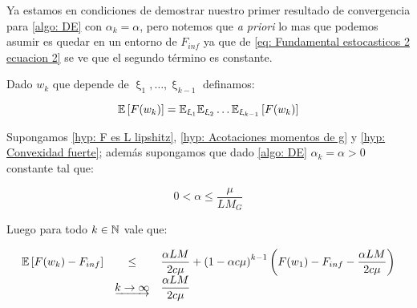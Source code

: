 Ya estamos en condiciones de demostrar nuestro primer resultado de convergencia para \ref{algo: DE} con $\alpha_k = \alpha$, pero notemos que \textit{a priori} lo mas que podemos asumir es quedar en un entorno de $F_{inf}$ ya que de \ref{eq: Fundamental estocasticos 2 ecuacion 2} se ve que el segundo t\'ermino es constante.

Dado $w_k$ que depende de $\upxi_{1}, \dots, \upxi_{k-1}$ definamos:

\begin{equation*}
	\label{def: esperanza total}
	\mathbb{E} \left[F(w_k)\right] = \mathbb{E}_{\upxi_{1}}\mathbb{E}_{\upxi_{2}}\dots \mathbb{E}_{\upxi_{k-1}}\left[F(w_k)\right]
\end{equation*}

\begin{theorem}
	\label{theorem: DE en fuertemente convexo y alfa fijo converge en l1}
	Supongamos \ref{hyp: F es L lipshitz}, \ref{hyp: Acotaciones momentos de g} y \ref{hyp: Convexidad fuerte}; adem\'as supongamos que dado \ref{algo: DE} $\alpha_k = \alpha >0 $ constante tal que:
	
	\begin{equation}
	\label{eq: Condicion alfa Conv L1 fuertemente convexo}
	0  < \alpha \leq \dfrac{\mu}{LM_G} 
	\end{equation}
	
	Luego para todo $k \in {\mathbb{N}}$ vale que:
	
	\begin{equation*}
	\begin{array}{rcl}
	\mathbb{E} \left[F(w_k) - F_{inf}\right] & \leq & \dfrac{\alpha LM}{2 c \mu} + \left(1 - \alpha c \mu \right)^{k-1} \left(F(w_1) - F_{inf} - \dfrac{\alpha LM}{2 c \mu} \right) \\
	& \underrightarrow{k \rightarrow \infty} & \dfrac{\alpha LM}{2 c \mu} 
	\end{array}
	\end{equation*}
	 
\end{theorem}

